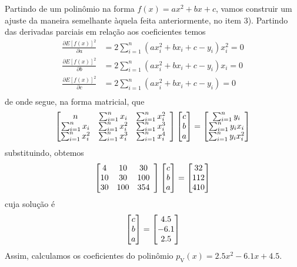 \documentclass{homework}
\begin{document}
	Partindo de um polinômio na forma $f(x) = a x^2 + b x + c$, vamos construir um ajuste da maneira semelhante àquela feita anteriormente, no item 3). Partindo das derivadas parciais em relação aos coeficientes temos
		\begin{align*}
		\frac{\partial E[f(x)]^2}{\partial a} &= 2 \sum_{i = 1}^{n} (a x_i^2 + b x_i + c - y_i) x_i^2 = 0\\
		\frac{\partial E[f(x)]^2}{\partial b} &= 2 \sum_{i = 1}^{n} (a x_i^2 + b x_i + c - y_i) x_i = 0\\
		\frac{\partial E[f(x)]^2}{\partial c} &= 2 \sum_{i = 1}^{n} (a x_i^2 + b x_i + c - y_i) = 0\\
		\end{align*}%
	de onde segue, na forma matricial, que
		$$ \left[\begin{array}{@{}cccc@{}} %
		n                      & \sum_{i = 1}^{n} x_i   & \sum_{i = 1}^{n} x_i^2\\
		\sum_{i = 1}^{n} x_i   & \sum_{i = 1}^{n} x_i^2 & \sum_{i = 1}^{n} x_i^3\\
		\sum_{i = 1}^{n} x_i^2 & \sum_{i = 1}^{n} x_i^3 & \sum_{i = 1}^{n} x_i^4
		\end{array}\right]%
		\left[\begin{array}{@{}c@{}} %
		c\\
		b\\
		a
		\end{array}\right]
		=		
		\left[\begin{array}{@{}c@{}} %
		\sum_{i = 1}^{n} y_i\\
		\sum_{i = 1}^{n} y_i x_i\\
		\sum_{i = 1}^{n} y_i x_i^2
		\end{array}\right]
		$$
	substituindo, obtemos
		$$ \left[\begin{array}{@{}cccc@{}} %
		4  & 10  & 30\\
		10 & 30  & 100\\
		30 & 100 & 354
		\end{array}\right]%
		\left[\begin{array}{@{}c@{}} %
		c\\
		b\\
		a
		\end{array}\right]
		=		
		\left[\begin{array}{@{}c@{}} %
		32\\
		112\\
		410
		\end{array}\right]
		$$
	cuja solução é
		$$
		\left[\begin{array}{@{}c@{}} %
		c\\
		b\\
		a
		\end{array}\right]
		=		
		\left[\begin{array}{@{}c@{}} %
		4.5\\
		-6.1\\
		2.5
		\end{array}\right]
		$$
	Assim, calculamos os coeficientes do polinômio $p_\text{V}(x) = 2.5 x^2 - 6.1 x + 4.5$.
	
\end{document}
